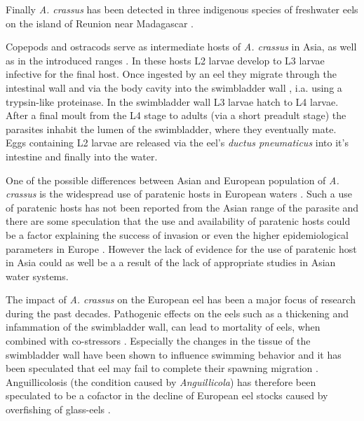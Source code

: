 Finally \textit{A. crassus} has been detected in three indigenous
species of freshwater eels on the island of Reunion near Madagascar
\cite{sasal_parasite_2008}.

Copepods and ostracods serve as intermediate hosts of
\textit{A. crassus} in Asia, as well as in the introduced ranges
\cite{moravec_first_2005}. In these hosts L2 larvae develop to L3
larvae infective for the final host. Once ingested by an eel they
migrate through the intestinal wall and via the body cavity into the
swimbladder wall \cite{haenen_effects_1996}, i.a. using a trypsin-like
proteinase\cite{polzer_identification_1993}. In the swimbladder wall
L3 larvae hatch to L4 larvae. After a final moult from the L4 stage to
adults (via a short preadult stage) the parasites inhabit the lumen of
the swimbladder, where they eventually mate. Eggs containing L2 larvae
are released via the eel's \textit{ductus pneumaticus} into it's intestine
and finally into the water\cite{de_charleroy_life_1990}.


One of the possible differences between Asian and European population
of \textit{A. crassus} is the widespread use of paratenic hosts in
European waters
\cite{thomas_paratenic_1992,pietrock_dynamics_2002}. Such a use of
paratenic hosts has not been reported from the Asian range of the
parasite and there are some speculation that the use and availability
of paratenic hosts could be a factor explaining the success of
invasion or even the higher epidemiological parameters in Europe
\cite{thomas_paratenic_1992}. However the lack of evidence for the use
of paratenic host in Asia could as well be a a result of the lack of
appropriate studies in Asian water systems.

The impact of \textit{A. crassus} on the European eel has been a major
focus of research during the past decades. Pathogenic effects on the
eels such as a thickening \cite{wurtz_tara_2000} and infammation
\cite{beregi_radiodiagnostic_1998} of the swimbladder wall, can lead
to mortality of eels, when combined with co-stressors
\cite{gollock_physiological_2005}. Especially the changes in the
tissue of the swimbladder wall have been shown to influence swimming
behavior and it has been speculated that eel may fail to complete
their spawning migration \cite{palstra_swimming_2007}. Anguillicolosis
(the condition caused by \textit{Anguillicola}) has therefore been
speculated to be a cofactor in the decline of European eel stocks
\cite{sures_science_letter} caused by overfishing of glass-eels
\cite{pmid12713741}.

